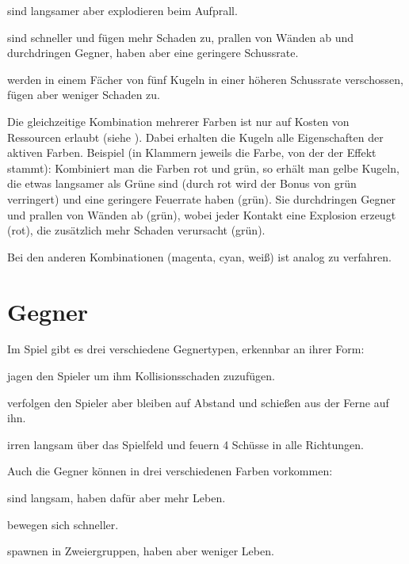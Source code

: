 \renewcommand{\itmspace}{4.5em}
{sind langsamer aber explodieren beim Aufprall.}

{sind schneller und fügen mehr Schaden zu, prallen von Wänden ab und durchdringen Gegner, haben aber eine geringere Schussrate.}

{werden in einem Fächer von fünf Kugeln in einer höheren Schussrate verschossen, fügen aber weniger Schaden zu.}

Die gleichzeitige Kombination mehrerer Farben ist nur auf Kosten von Ressourcen erlaubt  (siehe ). Dabei erhalten die Kugeln alle Eigenschaften der aktiven Farben.
Beispiel (in Klammern jeweils die Farbe, von der der Effekt stammt): Kombiniert man die Farben rot und grün, so erhält man gelbe Kugeln, die etwas langsamer als Grüne sind (durch rot wird der Bonus von grün verringert) und eine geringere Feuerrate haben (grün). Sie durchdringen Gegner und prallen von Wänden ab (grün), wobei jeder Kontakt eine Explosion erzeugt (rot), die zusätzlich mehr Schaden verursacht (grün).

Bei den anderen Kombinationen (magenta, cyan, wei{\ss}) ist analog zu verfahren.


\section{Gegner}

Im Spiel gibt es drei verschiedene Gegnertypen, erkennbar an ihrer Form:

\renewcommand{\itmspace}{4.5em}
{jagen den Spieler um ihm Kollisionsschaden zuzufügen.}

{verfolgen den Spieler aber bleiben auf Abstand und schie{\ss}en aus der Ferne auf ihn.}

{irren langsam über das Spielfeld und feuern 4 Schüsse in alle Richtungen.}

Auch die Gegner können in drei verschiedenen Farben vorkommen:

\renewcommand{\itmspace}{7.5em}
{sind langsam, haben dafür aber mehr Leben.}

{bewegen sich schneller.}

{spawnen in Zweiergruppen, haben aber weniger Leben.}

